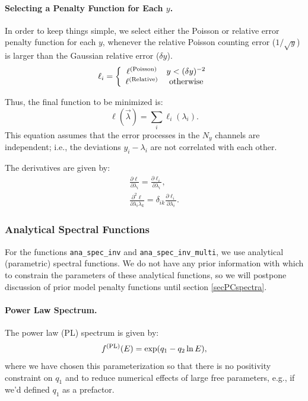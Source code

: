 \documentclass{article}    %
\newcommand{\subsubsubsection}[1]{\paragraph{#1.}}
\begin{document}
\subsubsubsection{Selecting a Penalty Function for Each $y$}

In order to keep things simple, we select either the Poisson or
relative error penalty function for each $y$, whenever the relative
Poisson counting error ($1/\sqrt{y}$) is larger than the Gaussian
relative error ($\delta y$).
\begin{equation}
\ell_i = \left\{
\begin{array}{cl}
\ell^{\rm (Poisson)} & y < (\delta y)^{-2} \\
\ell^{\rm (Relative)} & {\rm ~ otherwise}
\end{array}
\right.
\end{equation}

Thus, the final function to be minimized is:
\begin{equation}
\ell(\vec{\lambda}) = \sum_i \ell_i(\lambda_i). \label{eqEll}
\end{equation}
This equation assumes that the error processes in the $N_y$ channels
are independent; i.e., the deviations $y_i-\lambda_i$ are not
correlated with each other.

The derivatives are given by:
\begin{eqnarray}
\frac{\partial \ell}{\partial \lambda_i} = \frac{\partial \ell_i}{\partial \lambda_i}, \\
\frac{\partial^2 \ell}{\partial \lambda_i \lambda_k} = \delta_{ik}\frac{\partial \ell_i}{\partial \lambda_i}.
\end{eqnarray}

\subsubsection{Analytical Spectral Functions}
\label{secAnalyticalSpectra}

For the functions \verb|ana_spec_inv| and \verb|ana_spec_inv_multi|,
we use analytical (parametric) spectral functions. We do not have any
prior information with which to constrain the parameters of these
analytical functions, so we will postpone discussion of prior model
penalty functions until section \ref{secPCspectra}.

\subsubsubsection{Power Law Spectrum}

The power law (PL) spectrum is given by:
\begin{equation}
f^{\rm (PL)}(E) = \exp(q_1 - q_2\ln E),
\end{equation}
where we have chosen this parameterization so that there is no
positivity constraint on $q_1$ and to reduce numerical effects of
large free parameters, e.g., if we'd defined $q_1$ as a prefactor.
\end{document}
